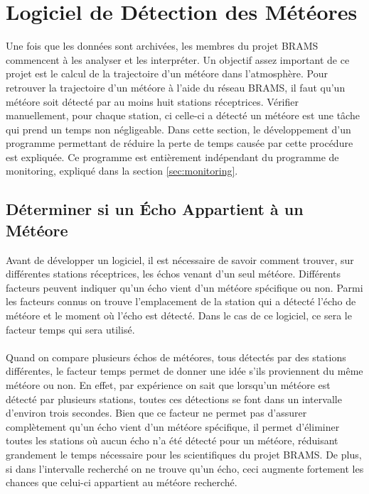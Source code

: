 \documentclass[11pt]{article}
\begin{document}
\newpage

\section{Logiciel de Détection des Météores}

Une fois que les données sont archivées, les membres du projet BRAMS commencent à les analyser et les interpréter.
Un objectif assez important de ce projet est le calcul de la trajectoire d'un météore dans l'atmosphère.
Pour retrouver la trajectoire d'un météore à l'aide du réseau BRAMS, il faut qu'un météore soit détecté par au moins huit stations réceptrices.
Vérifier manuellement, pour chaque station, ci celle-ci a détecté un météore est une tâche qui prend un temps non négligeable.
Dans cette section, le développement d'un programme permettant de réduire la perte de temps causée par cette procédure est expliquée.
Ce programme est entièrement indépendant du programme de monitoring, expliqué dans la section \ref{sec:monitoring}.

\subsection{Déterminer si un Écho Appartient à un Météore}

Avant de développer un logiciel, il est nécessaire de savoir comment trouver, sur différentes stations réceptrices, les échos venant d'un seul météore.
Différents facteurs peuvent indiquer qu'un écho vient d'un météore spécifique ou non.
Parmi les facteurs connus on trouve l'emplacement de la station qui a détecté l'écho de météore et le moment où l'écho est détecté.
Dans le cas de ce logiciel, ce sera le facteur temps qui sera utilisé.\\
\\
Quand on compare plusieurs échos de météores, tous détectés par des stations différentes, le facteur temps permet de donner une idée s'ils proviennent du même météore ou non.
En effet, par expérience on sait que lorsqu'un météore est détecté par plusieurs stations, toutes ces détections se font dans un intervalle d'environ trois secondes.
Bien que ce facteur ne permet pas d'assurer complètement qu'un écho vient d'un météore spécifique, il permet d'éliminer toutes les stations où aucun écho n'a été détecté pour un météore, réduisant grandement le temps nécessaire pour les scientifiques du projet BRAMS.
De plus, si dans l'intervalle recherché on ne trouve qu'un écho, ceci augmente fortement les chances que celui-ci appartient au météore recherché.
\end{document}
